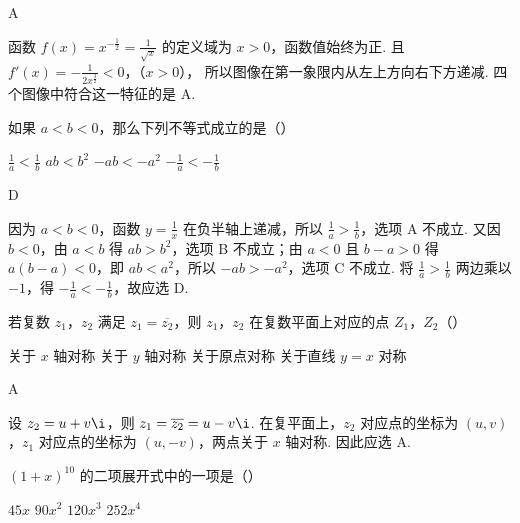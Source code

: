 \begin{answer}
A
\end{answer}

\begin{solution}
函数 \(f(x)=x^{-\frac{1}{2}}=\frac1{\sqrt{x}}\) 的定义域为 \(x>0\)，函数值始终为正. 且
\(f'(x)=-\frac{1}{2x^{\frac{3}{2}}}<0\)，（\(x>0\)），
所以图像在第一象限内从左上方向右下方递减. 四个图像中符合这一特征的是 A.
\end{solution}

\begin{problem}
如果 \(a < b < 0\)，那么下列不等式成立的是（\quad）

\choices
    {\( \frac{1}{a} < \frac{1}{b} \)}
    {\( ab < b^{2} \)}
    {\( -ab < -a^{2} \)}
    {\( -\frac{1}{a} < -\frac{1}{b} \)}
\end{problem}

\begin{answer}
D
\end{answer}

\begin{solution}
因为 \(a<b<0\)，函数 \(y=\frac1x\) 在负半轴上递减，所以 \(\frac1a>\frac1b\)，选项 A 不成立. 又因 \(b<0\)，由 \(a<b\) 得 \(ab>b^2\)，选项 B 不成立；由 \(a<0\) 且 \(b-a>0\) 得 \(a(b-a)<0\)，即 \(ab<a^2\)，所以 \(-ab>-a^2\)，选项 C 不成立. 将 \(\frac1a>\frac1b\) 两边乘以 \(-1\)，得 \(-\frac1a<-\frac1b\)，故应选 D.
\end{solution}

\begin{problem}
若复数 \( z_{1} \)，\( z_{2} \) 满足 \( z_{1}=\overline{z_{2}} \)，则 \( z_{1} \)，\( z_{2} \) 在复数平面上对应的点 \(Z_{1}\)，\(Z_{2}\)（\quad）

\choices
    {关于 \(x\) 轴对称}
    {关于 \(y\) 轴对称}
    {关于原点对称}
    {关于直线 \(y = x\) 对称}
\end{problem}

\begin{answer}
A
\end{answer}

\begin{solution}
设 \(z_2=u+v\i\)，则 \(z_1=\overline{z_2}=u-v\i\). 在复平面上，\(z_2\) 对应点的坐标为 \((u,v)\)，\(z_1\) 对应点的坐标为 \((u,-v)\)，两点关于 \(x\) 轴对称. 因此应选 A.
\end{solution}

\begin{problem}
\( (1+x)^{10} \) 的二项展开式中的一项是（\quad）

\choices
    {\(45x\)}
    {\( 90x^{2} \)}
    {\( 120x^{3} \)}
    {\( 252x^{4} \)}
\end{problem}

